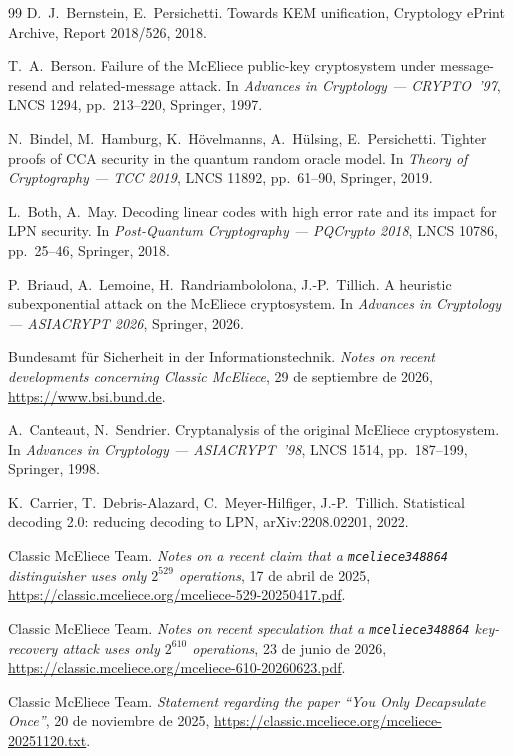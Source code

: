 \documentclass[11pt,a4paper,oneside]{report}
\begin{document}
\begin{thebibliography}{99}
D.~J.~Bernstein, E.~Persichetti. Towards KEM unification, Cryptology
ePrint Archive, Report 2018/526, 2018.

T.~A.~Berson. Failure of the McEliece public-key cryptosystem under
message-resend and related-message attack. In \emph{Advances in
Cryptology --- CRYPTO~'97}, LNCS 1294, pp.~213--220, Springer, 1997.

N.~Bindel, M.~Hamburg, K.~H\"ovelmanns, A.~H\"ulsing, E.~Persichetti.
Tighter proofs of CCA security in the quantum random oracle model.
In \emph{Theory of Cryptography --- TCC 2019}, LNCS 11892,
pp.~61--90, Springer, 2019.

L.~Both, A.~May. Decoding linear codes with high error rate and its
impact for LPN security. In \emph{Post-Quantum Cryptography ---
PQCrypto 2018}, LNCS 10786, pp.~25--46, Springer, 2018.

P.~Briaud, A.~Lemoine, H.~Randriambololona, J.-P.~Tillich. A
heuristic subexponential attack on the McEliece cryptosystem. In
\emph{Advances in Cryptology --- ASIACRYPT 2026}, Springer, 2026.

Bundesamt f\"ur Sicherheit in der Informationstechnik. \emph{Notes on
recent developments concerning Classic McEliece}, 29 de septiembre
de 2026, \url{https://www.bsi.bund.de}.

A.~Canteaut, N.~Sendrier. Cryptanalysis of the original McEliece
cryptosystem. In \emph{Advances in Cryptology --- ASIACRYPT~'98},
LNCS 1514, pp.~187--199, Springer, 1998.

K.~Carrier, T.~Debris-Alazard, C.~Meyer-Hilfiger, J.-P.~Tillich.
Statistical decoding 2.0: reducing decoding to LPN,
arXiv:2208.02201, 2022.

Classic McEliece Team. \emph{Notes on a recent claim that a
\texttt{mceliece348864} distinguisher uses only $2^{529}$
operations}, 17 de abril de 2025,
\url{https://classic.mceliece.org/mceliece-529-20250417.pdf}.

Classic McEliece Team. \emph{Notes on recent speculation that a
\texttt{mceliece348864} key-recovery attack uses only $2^{610}$
operations}, 23 de junio de 2026,
\url{https://classic.mceliece.org/mceliece-610-20260623.pdf}.

Classic McEliece Team. \emph{Statement regarding the paper ``You Only
Decapsulate Once''}, 20 de noviembre de 2025,
\url{https://classic.mceliece.org/mceliece-20251120.txt}.


\end{thebibliography}
\end{document}
